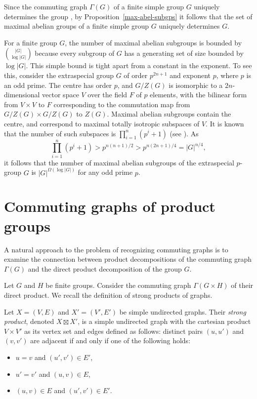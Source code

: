 \documentclass{elsarticle}
\begin{document}
\begin{remark}
Since the commuting graph $\Gamma(G)$ of a finite simple group $G$
uniquely determines the group \cite{SW13}, by Proposition~\ref{max-abel-subgps}
it follows that the set of maximal abelian groups of a finite simple
group $G$ uniquely determines $G$.

For a finite group $G$, the number of maximal abelian subgroups is
bounded by ${|G|}\choose {\log|G|}$ because every subgroup of $G$ has
a generating set of size bounded by $\log|G|$. This simple bound is tight apart from a constant in the exponent. To
see this, consider the extraspecial group $G$ of order $p^{2n+1}$ and
exponent $p$, where $p$ is an odd prime. The centre has order $p$, and
$G/Z(G)$ is isomorphic to a $2n$-dimensional vector space $V$ over the
field $F$ of $p$ elements, with the bilinear form from $V\times V$ to
$F$ corresponding to the commutation map from $G/Z(G)\times G/Z(G)$ to
$Z(G)$. Maximal abelian subgroups contain the centre, and correspond
to maximal totally isotropic subspaces of $V$. It is known that the
number of such subspaces is $\prod_{i=1}^n(p^i+1)$ (see
\cite{Tay}). As
\[
  \prod_{i=1}^n(p^i+1) > p^{n(n+1)/2}>p^{n(2n+1)/4}=|G|^{n/4},
\]
it follows that the number of maximal abelian subgroups of the
extraspecial $p$-group $G$ is $|G|^{\Omega(\log |G|)}$ for any odd
prime $p$.
\end{remark}

\section{Commuting graphs of product groups}\label{prod-sec}

A natural approach to the problem of recognizing commuting graphs is
to examine the connection between product decompositions of the
commuting graph $\Gamma(G)$ and the direct product decomposition of
the group $G$.

Let $G$ and $H$ be finite groups. Consider the commuting graph
$\Gamma(G\times H)$ of their direct product. We recall the
definition of strong products of graphs.

\begin{defn}{\rm\cite[Chapter 4, Page 35]{IK08book}}
Let $X=(V,E)$ and $X'=(V',E')$ be simple undirected graphs. Their
\emph{strong product}, denoted $X\boxtimes X'$, is a simple undirected
graph with the cartesian product $V\times V'$ as its vertex set and
edges defined as follows: distinct pairs $(u,u')$ and $(v,v')$ are
adjacent if and only if one of the following holds:
\begin{itemize}
\item $u=v$ and $(u',v')\in E'$,
\item $u'=v'$ and $(u,v)\in E$,
\item $(u,v)\in E$ and $(u',v')\in E'$.
\end{itemize}
\end{defn}
\end{document}
